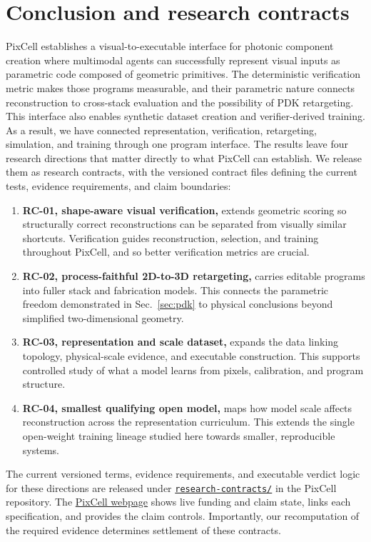 \documentclass[%
 reprint,
 superscriptaddress,
 amsmath,amssymb,
 aps,
 pra,
 longbibliography,
 floatfix,
]{revtex4-2}
\begin{document}
\section{Conclusion and research contracts}\label{sec:conclusion}

PixCell establishes a visual-to-executable interface for photonic component
creation where multimodal agents can successfully represent visual inputs as
parametric code composed of geometric primitives. The deterministic
verification metric makes those programs measurable, and their parametric
nature connects reconstruction to cross-stack evaluation and the possibility
of PDK retargeting. This interface also enables synthetic dataset creation and
verifier-derived training. As a result, we have connected representation,
verification, retargeting, simulation, and training through one program
interface. The results leave four research directions that matter directly to
what PixCell can establish. We release them as research contracts, with the
versioned contract files defining the current tests, evidence requirements,
and claim boundaries:
\begin{enumerate}
\item \textbf{RC-01, shape-aware visual verification,} extends geometric scoring so
structurally correct reconstructions can be separated from visually similar
shortcuts. Verification guides reconstruction, selection, and training
throughout PixCell, and so better verification metrics are crucial.
\item \textbf{RC-02, process-faithful 2D-to-3D retargeting,} carries editable programs
into fuller stack and fabrication models. This connects the parametric freedom
demonstrated in Sec.~\ref{sec:pdk} to physical conclusions beyond
simplified two-dimensional geometry.
\item \textbf{RC-03, representation and scale dataset,} expands the data linking
topology, physical-scale evidence, and executable construction. This supports
controlled study of what a model learns from pixels, calibration, and program
structure.
\item \textbf{RC-04, smallest qualifying open model,} maps how model scale
affects reconstruction across the representation curriculum. This extends the
single open-weight training lineage studied here towards smaller,
reproducible systems.
\end{enumerate}

The current versioned terms, evidence requirements, and executable verdict
logic for these directions are released under
\href{https://github.com/QPG-MIT/PixCell/tree/main/research-contracts}
{\texttt{research-contracts/}} in the PixCell repository. The
\href{https://pixcell.qpaig.com/\#research-contracts}{PixCell webpage}
shows live funding and claim state, links each specification, and provides the
claim controls. Importantly, our recomputation of the required evidence
determines settlement of these contracts.
\end{document}
